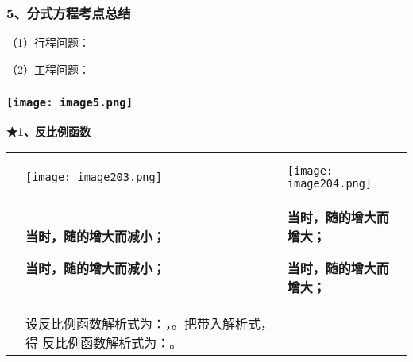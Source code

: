 \hypertarget{ux5206ux5f0fux65b9ux7a0bux8003ux70b9ux603bux7ed3}{%
\subsubsection{\texorpdfstring{\textbf{5、分式方程考点总结}}{5、分式方程考点总结}}\label{ux5206ux5f0fux65b9ux7a0bux8003ux70b9ux603bux7ed3}}

（1）行程问题：

（2）工程问题：

\hypertarget{ux5b66ux79d1ux7f51www.zxxk.com--ux6559ux80b2ux8d44ux6e90ux95e8ux6237ux63d0ux4f9bux8bd5ux9898ux8bd5ux5377ux6559ux6848ux8bfeux4ef6ux6559ux5b66ux8bbaux6587ux7d20ux6750ux7b49ux5404ux7c7bux6559ux5b66ux8d44ux6e90ux5e93ux4e0bux8f7dux8fd8ux6709ux5927ux91cfux4e30ux5bccux7684ux6559ux5b66ux8d44ux8baf-37}{%
\subsubsection{\texorpdfstring{\protect\texttt{[image: image5.png]}}{学科网(www.zxxk.com)-\/-教育资源门户，提供试题试卷、教案、课件、教学论文、素材等各类教学资源库下载，还有大量丰富的教学资讯！}}\label{ux5b66ux79d1ux7f51www.zxxk.com--ux6559ux80b2ux8d44ux6e90ux95e8ux6237ux63d0ux4f9bux8bd5ux9898ux8bd5ux5377ux6559ux6848ux8bfeux4ef6ux6559ux5b66ux8bbaux6587ux7d20ux6750ux7b49ux5404ux7c7bux6559ux5b66ux8d44ux6e90ux5e93ux4e0bux8f7dux8fd8ux6709ux5927ux91cfux4e30ux5bccux7684ux6559ux5b66ux8d44ux8baf-37}}

\textbf{★1、反比例函数}

\begin{longtable}[]{@{}lll@{}}
\toprule
\endhead
& &\tabularnewline
& &\tabularnewline
& \texttt{[image: image203.png]} &
\texttt{[image: image204.png]}\tabularnewline
\begin{minipage}[t]{0.30\columnwidth}\raggedright
\strut
\end{minipage} & \begin{minipage}[t]{0.30\columnwidth}\raggedright
\textbf{当时，随的增大而减小；}

\textbf{当时，随的增大而减小；}\strut
\end{minipage} & \begin{minipage}[t]{0.30\columnwidth}\raggedright
\textbf{当时，随的增大而增大；}

\textbf{当时，随的增大而增大；}\strut
\end{minipage}\tabularnewline
& 设反比例函数解析式为：，。把带入解析式，得 反比例函数解析式为：。
&\tabularnewline
\bottomrule
\end{longtable}


